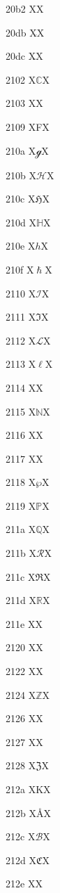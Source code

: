 \documentclass[11pt]{article}
\begin{document}
20b2 X{\textguarani}X

20db X{\ensuremath{\dddot{}}}X

20dc X{\ensuremath{\ddddot{}}}X

2102 X{\ensuremath{\mathbb{C}}}X

2103 X{\textcelsius}X

2109 X{\textdegree{}F}X

210a X{\ensuremath{\mathscr{g}}}X

210b X{\ensuremath{\mathscr{H}}}X

210c X{\ensuremath{\mathfrak{H}}}X

210d X{\ensuremath{\mathbb{H}}}X

210e X{\ensuremath{h}}X

210f X{\ensuremath{\hslash}}X

2110 X{\ensuremath{\mathscr{I}}}X

2111 X{\ensuremath{\Im}}X

2112 X{\ensuremath{\mathscr{L}}}X

2113 X{\ensuremath{\ell}}X

2114 X{\Pfund}X

2115 X{\ensuremath{\mathbb{N}}}X

2116 X{\textnumero}X

2117 X{\textcircledP}X

2118 X{\ensuremath{\wp}}X

2119 X{\ensuremath{\mathbb{P}}}X

211a X{\ensuremath{\mathbb{Q}}}X

211b X{\ensuremath{\mathscr{R}}}X

211c X{\ensuremath{\Re}}X

211d X{\ensuremath{\mathbb{R}}}X

211e X{\textrecipe}X

2120 X{\textservicemark}X

2122 X{\texttrademark}X

2124 X{\ensuremath{\mathbb{Z}}}X

2126 X{\textohm}X

2127 X{\textmho}X

2128 X{\ensuremath{\mathfrak{Z}}}X

212a X{K}X

212b X{\AA}X

212c X{\ensuremath{\mathscr{B}}}X

212d X{\ensuremath{\mathfrak{C}}}X

212e X{\textestimated}X
\end{document}

